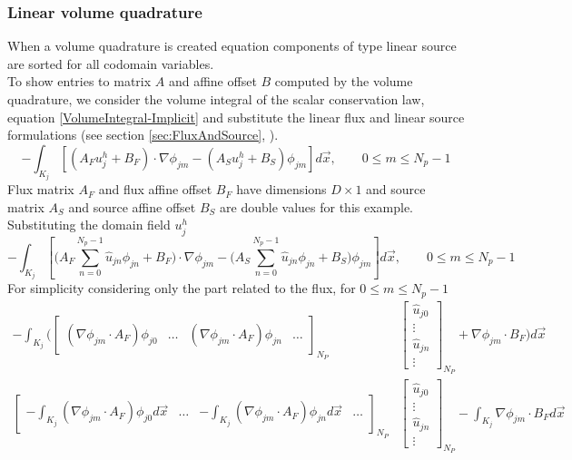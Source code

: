\documentclass[BoSSSForSolvingConservationLaws.tex]{subfiles}
\begin{document}
\subsubsection{Linear volume quadrature}
\label{sec:LinearVolumeQuadrature}
When a volume quadrature is created equation components of type linear source are sorted for all codomain variables.\\
To show entries to matrix $A$ and affine offset $B$ computed by the volume quadrature, we consider the volume integral of the scalar conservation law, equation \eqref{VolumeIntegral-Implicit} and substitute the linear flux and linear source formulations (see section \ref{sec:FluxAndSource}, ).
\[
-\int_{K_j} [(A_F u_j^h+B_F)\cdot \nabla \phi_{jm} - (A_S u_j^h+B_S) \phi_{jm}] d\vec{x},\qquad 0\leq m \leq N_p-1
\]
Flux matrix $A_F$ and flux affine offset $B_F$ have dimensions $D\times1$ and source matrix $A_S$ and source affine offset $B_S$ are double values for this example. Substituting the domain field $u_j^h$
\[
-\int_{K_j} [\bigg( A_F \sum_{n=0}^{N_p-1} \hat u_{jn} \phi_{jn}+B_F \bigg)\cdot \nabla \phi_{jm}-\bigg( A_S \sum_{n=0}^{N_p-1} \hat u_{jn} \phi_{jn}+B_S \bigg)\phi_{jm}] d\vec{x},\qquad 0\leq m \leq N_p-1
\]
For simplicity considering only the part related to the flux, for $0\leq m \leq N_p-1$
\begin{align*}
-\int_{K_j}
\bigg(\begin{bmatrix}
(\nabla \phi_{jm}\cdot A_F) \phi_{j0} & \dots & (\nabla \phi_{jm}\cdot A_F) \phi_{jn}  & \dots
\end{bmatrix}_{N_P}
&\begin{bmatrix}
\hat u_{j0}\\
\vdots\\
\hat u_{jn}\\
\vdots
\end{bmatrix}_{N_P}+\nabla \phi_{jm}\cdot B_F \bigg)
d\vec{x}\\
\begin{bmatrix}
-\int_{K_j} (\nabla \phi_{jm}\cdot A_F) \phi_{j0} d\vec{x} & \dots & -\int_{K_j} (\nabla \phi_{jm}\cdot A_F) \phi_{jn} d\vec{x}  & \dots
\end{bmatrix}_{N_P}
&\begin{bmatrix}
\hat u_{j0}\\
\vdots\\
\hat u_{jn}\\
\vdots
\end{bmatrix}_{N_P}-\int_{K_j} \nabla \phi_{jm}\cdot B_F d\vec{x}
\end{align*}
\end{document}
